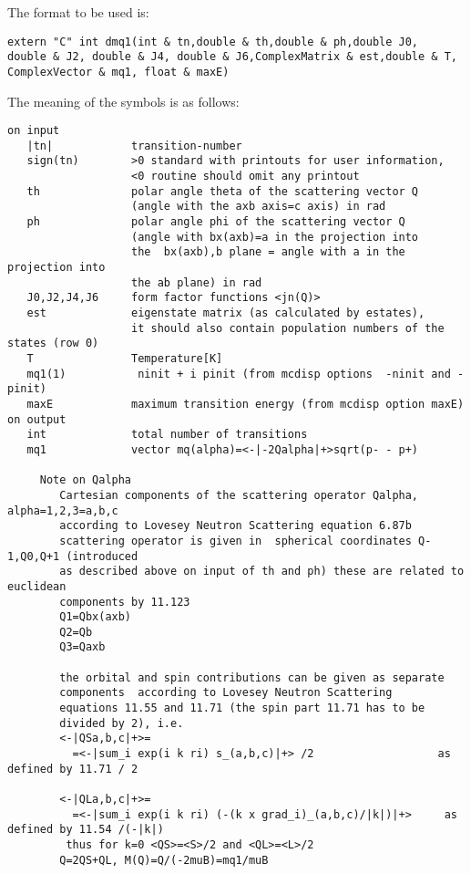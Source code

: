 The format to be used is:
{\footnotesize
\begin{verbatim}
extern "C" int dmq1(int & tn,double & th,double & ph,double J0,
double & J2, double & J4, double & J6,ComplexMatrix & est,double & T,
ComplexVector & mq1, float & maxE)
\end{verbatim}

The meaning of the symbols is as follows:

\begin{verbatim}
on input
   |tn|            transition-number  
   sign(tn)        >0 standard with printouts for user information, 
                   <0 routine should omit any printout
   th              polar angle theta of the scattering vector Q 
                   (angle with the axb axis=c axis) in rad
   ph              polar angle phi of the scattering vector Q 
                   (angle with bx(axb)=a in the projection into
                   the  bx(axb),b plane = angle with a in the projection into 
				   the ab plane) in rad
   J0,J2,J4,J6     form factor functions <jn(Q)>   
   est             eigenstate matrix (as calculated by estates),
                   it should also contain population numbers of the states (row 0)
   T               Temperature[K]
   mq1(1)           ninit + i pinit (from mcdisp options  -ninit and -pinit)
   maxE            maximum transition energy (from mcdisp option maxE)
on output
   int             total number of transitions
   mq1             vector mq(alpha)=<-|-2Qalpha|+>sqrt(p- - p+)
                   
     Note on Qalpha
        Cartesian components of the scattering operator Qalpha, alpha=1,2,3=a,b,c
        according to Lovesey Neutron Scattering equation 6.87b 
        scattering operator is given in  spherical coordinates Q-1,Q0,Q+1 (introduced
        as described above on input of th and ph) these are related to euclidean 
		components by 11.123
        Q1=Qbx(axb)
        Q2=Qb                         
        Q3=Qaxb    
                   
        the orbital and spin contributions can be given as separate 
		components  according to Lovesey Neutron Scattering 
		equations 11.55 and 11.71 (the spin part 11.71 has to be
        divided by 2), i.e.
        <-|QSa,b,c|+>=
          =<-|sum_i exp(i k ri) s_(a,b,c)|+> /2                   as defined by 11.71 / 2
				   
        <-|QLa,b,c|+>=
          =<-|sum_i exp(i k ri) (-(k x grad_i)_(a,b,c)/|k|)|+>     as defined by 11.54 /(-|k|)
	     thus for k=0 <QS>=<S>/2 and <QL>=<L>/2 
        Q=2QS+QL, M(Q)=Q/(-2muB)=mq1/muB
				
\end{verbatim}
}


